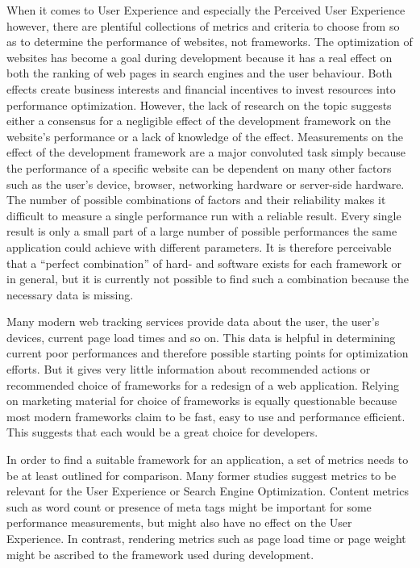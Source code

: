 \documentclass[a4paper, 10pt]{article}
\begin{document}
When it comes to User Experience and especially the Perceived User Experience however, there are plentiful collections of metrics and criteria to choose from so as to determine the performance of websites, not frameworks.
The optimization of websites has become a goal during development because it has a real effect on both the ranking of web pages in search engines and the user behaviour.
Both effects create business interests and financial incentives to invest resources into performance optimization.
However, the lack of research on the topic suggests either a consensus for a negligible effect of the development framework on the website's performance or a lack of knowledge of the effect.
Measurements on the effect of the development framework are a major convoluted task simply because the performance of a specific website can be dependent on many other factors such as the user's device, browser, networking hardware or server-side hardware.
The number of possible combinations of factors and their reliability makes it difficult to measure a single performance run with a reliable result.
Every single result is only a small part of a large number of possible performances the same application could achieve with different parameters.
It is therefore perceivable that a \enquote{perfect combination} of hard- and software exists for each framework or in general, but it is currently not possible to find such a combination because the necessary data is missing.

Many modern web tracking services provide data about the user, the user's devices, current page load times and so on.
This data is helpful in determining current poor performances and therefore possible starting points for optimization efforts.
But it gives very little information about recommended actions or recommended choice of frameworks for a redesign of a web application.
Relying on marketing material for choice of frameworks is equally questionable because most modern frameworks claim to be fast, easy to use and performance efficient.
This suggests that each would be a great choice for developers.

In order to find a suitable framework for an application, a set of metrics needs to be at least outlined for comparison.
Many former studies suggest metrics to be relevant for the User Experience or Search Engine Optimization.
Content metrics such as word count or presence of meta tags might be important for some performance measurements, but might also have no effect on the User Experience.
In contrast, rendering metrics such as page load time or page weight might be ascribed to the framework used during development.
\end{document}

